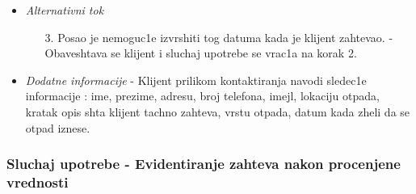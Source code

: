 \documentclass[10 pt]{article}
\begin{document}
\begin{itemize}
			\item\textit{Alternativni tok}
				\begin{enumerate}
					\item [3.] Posao je nemoguc1e izvrshiti tog datuma kada je klijent zahtevao.
- Obaveshtava se klijent i sluchaj upotrebe se vrac1a na korak 2.

					
				\end{enumerate}

			
			\item\textit{Dodatne informacije}
-	Klijent prilikom kontaktiranja navodi sledec1e informacije :
ime, prezime, adresu, broj telefona, imejl, lokaciju otpada, kratak opis shta klijent tachno zahteva, vrstu otpada, datum kada zheli da se otpad iznese.

			
		\end{itemize}
	
	\subsubsection{Sluchaj upotrebe - Evidentiranje zahteva nakon procenjene vrednosti}
	
\end{document}
